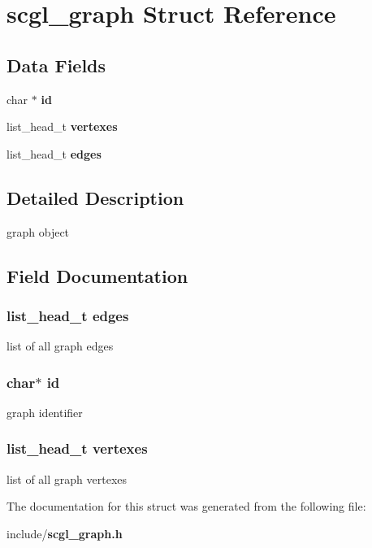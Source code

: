 \section{scgl\-\_\-graph Struct Reference}
\label{structscgl__graph}
\subsection*{Data Fields}
\begin{DoxyCompactItemize}
\item 
char $\ast$ {\bf id}
\item 
list\-\_\-head\-\_\-t {\bf vertexes}
\item 
list\-\_\-head\-\_\-t {\bf edges}
\end{DoxyCompactItemize}


\subsection{Detailed Description}
graph object 

\subsection{Field Documentation}
\subsubsection[{edges}]{\setlength{\rightskip}{0pt plus 5cm}list\-\_\-head\-\_\-t {\bf edges}}\label{structscgl__graph_a4d1e5bb40a5518b3bc79f44b9f0d1405}
list of all graph edges 
\subsubsection[{id}]{\setlength{\rightskip}{0pt plus 5cm}char$\ast$ {\bf id}}\label{structscgl__graph_aecb3b0d045ada529257a2fbf8f829599}
graph identifier 
\subsubsection[{vertexes}]{\setlength{\rightskip}{0pt plus 5cm}list\-\_\-head\-\_\-t {\bf vertexes}}\label{structscgl__graph_a435d15dcae44f06fafcde1eb2e64fc7f}
list of all graph vertexes 

The documentation for this struct was generated from the following file\-:\begin{DoxyCompactItemize}
\item 
include/{\bf scgl\-\_\-graph.\-h}\end{DoxyCompactItemize}
